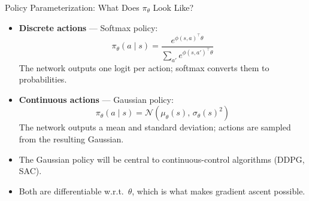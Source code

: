 \begin{frame}{Policy Parameterization: What Does $\pi_\theta$ Look Like?}
    \begin{itemize}
        \item \textbf{Discrete actions} --- Softmax policy:
        \[
            \pi_\theta(a \mid s) = \frac{e^{\phi(s,a)^\top \theta}}{\sum_{a'} e^{\phi(s,a')^\top \theta}}
        \]
        The network outputs one logit per action; softmax converts them to probabilities.
        \pause
        \item \textbf{Continuous actions} --- Gaussian policy:
        \[
            \pi_\theta(a \mid s) = \mathcal{N}\!\left(\mu_\theta(s),\, \sigma_\theta(s)^2\right)
        \]
        The network outputs a mean and standard deviation; actions are sampled from the resulting Gaussian.
        \pause
        \item The Gaussian policy will be central to continuous-control algorithms (DDPG, SAC).
        \item Both are differentiable w.r.t.\ $\theta$, which is what makes gradient ascent possible.
    \end{itemize}
\end{frame}
